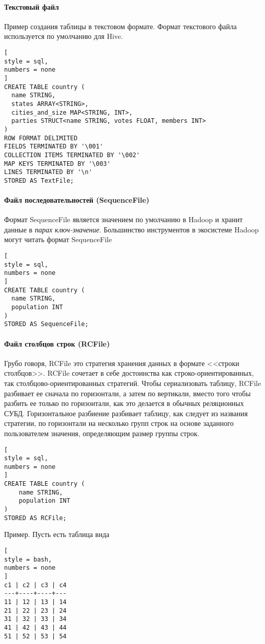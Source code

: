 \documentclass[%
	11pt,
	a4paper,
	utf8,
		]{article}
\begin{document}
\paragraph{Текстовый файл} Пример создания таблицы в текстовом формате. Формат текстового файла используется по умолчанию для Hive. 

\begin{lstlisting}[
style = sql,
numbers = none	
]
CREATE TABLE country (
  name STRING,
  states ARRAY<STRING>,
  cities_and_size MAP<STRING, INT>,
  parties STRUCT<name STRING, votes FLOAT, members INT>
)
ROW FORMAT DELIMITED
FIELDS TERMINATED BY '\001'
COLLECTION ITEMS TERMINATED BY '\002'
MAP KEYS TERMINATED BY '\003'
LINES TERMINATED BY '\n'
STORED AS TextFile;
\end{lstlisting}

\paragraph{Файл последовательностей (SequenceFile)} Формат SequenceFile является значением по умолчанию в Hadoop и хранит данные в \emph{парах ключ-значение}. Большинство инструментов в экосистеме Hadoop могут читать формат SequenceFile
\begin{lstlisting}[
style = sql,
numbers = none	
]
CREATE TABLE country (
  name STRING,
  population INT
)
STORED AS SequenceFile;
\end{lstlisting}

\paragraph{Файл столбцов строк (RCFile)} Грубо говоря, RCFile это стратегия хранения данных в формате <<строки столбцов>>. RCFile сочетает в себе достоинства как строко-ориентированных, так столбцово-ориентированных стратегий. Чтобы сериализовать таблицу, RCFile разбивает ее сначала по горизонтали, а затем по вертикали, вместо того чтобы разбить ее только по горизонтали, как это делается в обычных реляционных СУБД. Горизонтальное разбиение разбивает таблицу, как следует из названия стратегии, по горизонтали на несколько групп строк на основе заданного пользователем значения, определяющим размер группы строк.
\begin{lstlisting}[
style = sql,
numbers = none	
]
CREATE TABLE country (
	name STRING,
	population INT
)
STORED AS RCFile;
\end{lstlisting}

Пример. Пусть есть таблица вида
\begin{lstlisting}[
style = bash,
numbers = none	
]
c1 | c2 | c3 | c4
---+----+----+---
11 | 12 | 13 | 14
21 | 22 | 23 | 24
31 | 32 | 33 | 34
41 | 42 | 43 | 44
51 | 52 | 53 | 54
\end{lstlisting}
\end{document}
